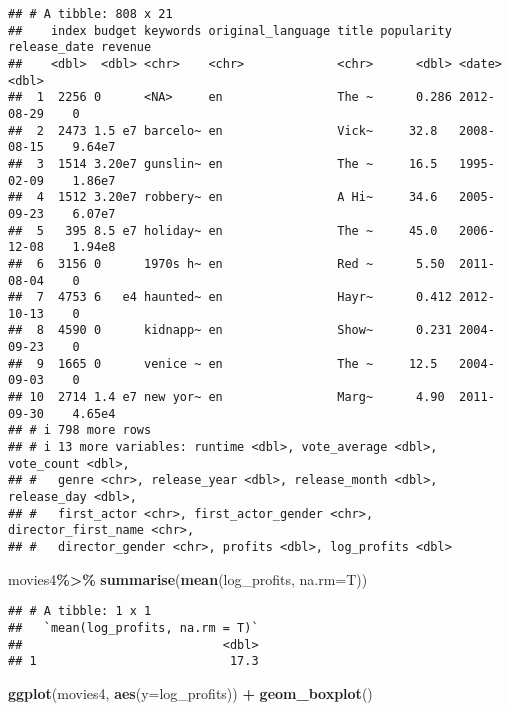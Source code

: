 \documentclass[
]{article}
\newenvironment{Shaded}{\begin{snugshade}}{\end{snugshade}}
\newcommand{\AttributeTok}[1]{\textcolor[rgb]{0.13,0.29,0.53}{#1}}
\newcommand{\FunctionTok}[1]{\textcolor[rgb]{0.13,0.29,0.53}{\textbf{#1}}}
\newcommand{\NormalTok}[1]{#1}
\newcommand{\SpecialCharTok}[1]{\textcolor[rgb]{0.81,0.36,0.00}{\textbf{#1}}}
\begin{document}
\begin{verbatim}
## # A tibble: 808 x 21
##    index budget keywords original_language title popularity release_date revenue
##    <dbl>  <dbl> <chr>    <chr>             <chr>      <dbl> <date>         <dbl>
##  1  2256 0      <NA>     en                The ~      0.286 2012-08-29    0     
##  2  2473 1.5 e7 barcelo~ en                Vick~     32.8   2008-08-15    9.64e7
##  3  1514 3.20e7 gunslin~ en                The ~     16.5   1995-02-09    1.86e7
##  4  1512 3.20e7 robbery~ en                A Hi~     34.6   2005-09-23    6.07e7
##  5   395 8.5 e7 holiday~ en                The ~     45.0   2006-12-08    1.94e8
##  6  3156 0      1970s h~ en                Red ~      5.50  2011-08-04    0     
##  7  4753 6   e4 haunted~ en                Hayr~      0.412 2012-10-13    0     
##  8  4590 0      kidnapp~ en                Show~      0.231 2004-09-23    0     
##  9  1665 0      venice ~ en                The ~     12.5   2004-09-03    0     
## 10  2714 1.4 e7 new yor~ en                Marg~      4.90  2011-09-30    4.65e4
## # i 798 more rows
## # i 13 more variables: runtime <dbl>, vote_average <dbl>, vote_count <dbl>,
## #   genre <chr>, release_year <dbl>, release_month <dbl>, release_day <dbl>,
## #   first_actor <chr>, first_actor_gender <chr>, director_first_name <chr>,
## #   director_gender <chr>, profits <dbl>, log_profits <dbl>
\end{verbatim}

\begin{Shaded}
\begin{Highlighting}[]
\NormalTok{movies4}\SpecialCharTok{\%\textgreater{}\%}
  \FunctionTok{summarise}\NormalTok{(}\FunctionTok{mean}\NormalTok{(log\_profits, }\AttributeTok{na.rm=}\NormalTok{T))}
\end{Highlighting}
\end{Shaded}

\begin{verbatim}
## # A tibble: 1 x 1
##   `mean(log_profits, na.rm = T)`
##                            <dbl>
## 1                           17.3
\end{verbatim}

\begin{Shaded}
\begin{Highlighting}[]
\FunctionTok{ggplot}\NormalTok{(movies4, }\FunctionTok{aes}\NormalTok{(}\AttributeTok{y=}\NormalTok{log\_profits)) }\SpecialCharTok{+}
  \FunctionTok{geom\_boxplot}\NormalTok{()}
\end{Highlighting}
\end{Shaded}
\end{document}
